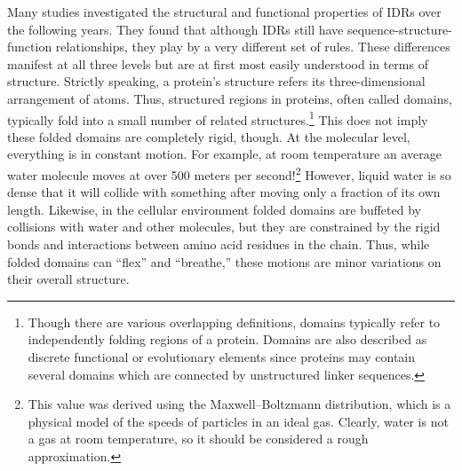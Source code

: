 Many studies investigated the structural and functional properties of IDRs over the following years. They found that although IDRs still have sequence-structure-function relationships, they play by a very different set of rules. These differences manifest at all three levels but are at first most easily understood in terms of structure. Strictly speaking, a protein's structure refers its three-dimensional arrangement of atoms. Thus, structured regions in proteins, often called domains, typically fold into a small number of related structures.\footnote{Though there are various overlapping definitions, domains typically refer to independently folding regions of a protein. Domains are also described as discrete functional or evolutionary elements since proteins may contain several domains which are connected by unstructured linker sequences.} This does not imply these folded domains are completely rigid, though. At the molecular level, everything is in constant motion. For example, at room temperature an average water molecule moves at over 500 meters per second!\footnote{This value was derived using the Maxwell–Boltzmann distribution, which is a physical model of the speeds of particles in an ideal gas. Clearly, water is not a gas at room temperature, so it should be considered a rough approximation.} However, liquid water is so dense that it will collide with something after moving only a fraction of its own length. Likewise, in the cellular environment folded domains are buffeted by collisions with water and other molecules, but they are constrained by the rigid bonds and interactions between amino acid residues in the chain. Thus, while folded domains can ``flex'' and ``breathe,'' these motions are minor variations on their overall structure.

